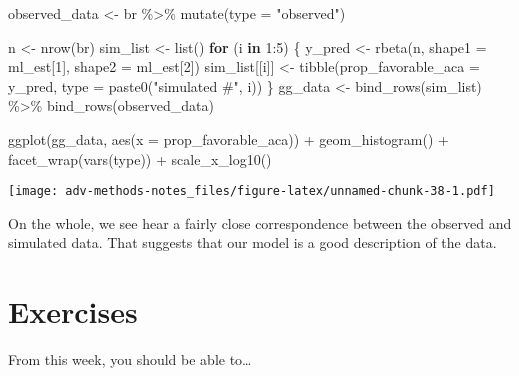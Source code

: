 \documentclass[
]{book}
\newenvironment{Shaded}{\begin{snugshade}}{\end{snugshade}}
\newcommand{\AttributeTok}[1]{\textcolor[rgb]{0.77,0.63,0.00}{#1}}
\newcommand{\ControlFlowTok}[1]{\textcolor[rgb]{0.13,0.29,0.53}{\textbf{#1}}}
\newcommand{\DecValTok}[1]{\textcolor[rgb]{0.00,0.00,0.81}{#1}}
\newcommand{\FunctionTok}[1]{\textcolor[rgb]{0.00,0.00,0.00}{#1}}
\newcommand{\NormalTok}[1]{#1}
\newcommand{\OtherTok}[1]{\textcolor[rgb]{0.56,0.35,0.01}{#1}}
\newcommand{\SpecialCharTok}[1]{\textcolor[rgb]{0.00,0.00,0.00}{#1}}
\newcommand{\StringTok}[1]{\textcolor[rgb]{0.31,0.60,0.02}{#1}}
\begin{document}
\begin{Shaded}
\begin{Highlighting}[]
\NormalTok{observed\_data }\OtherTok{\textless{}{-}}\NormalTok{ br }\SpecialCharTok{\%\textgreater{}\%}
  \FunctionTok{mutate}\NormalTok{(}\AttributeTok{type =} \StringTok{"observed"}\NormalTok{)}

\NormalTok{n }\OtherTok{\textless{}{-}} \FunctionTok{nrow}\NormalTok{(br)}
\NormalTok{sim\_list }\OtherTok{\textless{}{-}} \FunctionTok{list}\NormalTok{()}
\ControlFlowTok{for}\NormalTok{ (i }\ControlFlowTok{in} \DecValTok{1}\SpecialCharTok{:}\DecValTok{5}\NormalTok{) \{}
\NormalTok{  y\_pred }\OtherTok{\textless{}{-}} \FunctionTok{rbeta}\NormalTok{(n, }\AttributeTok{shape1 =}\NormalTok{ ml\_est[}\DecValTok{1}\NormalTok{], }\AttributeTok{shape2 =}\NormalTok{ ml\_est[}\DecValTok{2}\NormalTok{])}
\NormalTok{  sim\_list[[i]] }\OtherTok{\textless{}{-}} \FunctionTok{tibble}\NormalTok{(}\AttributeTok{prop\_favorable\_aca =}\NormalTok{ y\_pred, }
                          \AttributeTok{type =} \FunctionTok{paste0}\NormalTok{(}\StringTok{"simulated \#"}\NormalTok{, i))}
\NormalTok{\}}
\NormalTok{gg\_data }\OtherTok{\textless{}{-}} \FunctionTok{bind\_rows}\NormalTok{(sim\_list) }\SpecialCharTok{\%\textgreater{}\%}
  \FunctionTok{bind\_rows}\NormalTok{(observed\_data) }

\FunctionTok{ggplot}\NormalTok{(gg\_data, }\FunctionTok{aes}\NormalTok{(}\AttributeTok{x =}\NormalTok{ prop\_favorable\_aca)) }\SpecialCharTok{+} 
  \FunctionTok{geom\_histogram}\NormalTok{() }\SpecialCharTok{+} 
  \FunctionTok{facet\_wrap}\NormalTok{(}\FunctionTok{vars}\NormalTok{(type)) }\SpecialCharTok{+} 
  \FunctionTok{scale\_x\_log10}\NormalTok{()}
\end{Highlighting}
\end{Shaded}

\texttt{[image: adv-methods-notes\_files/figure-latex/unnamed-chunk-38-1.pdf]}

On the whole, we see hear a fairly close correspondence between the
observed and simulated data. That suggests that our model is a good
description of the data.

\hypertarget{exercises}{%
\section{Exercises}\label{exercises}}

From this week, you should be able to\ldots{}
\end{document}
